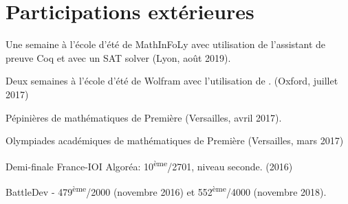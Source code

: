 \documentclass[11pt,a4paper,sans]{moderncv} %
\begin{document}
\section{Participations extérieures}
\begin{compactitem}
			
			\item Une semaine à l'école d'été de MathInFoLy avec utilisation de l'assistant de preuve Coq et  avec un SAT solver (Lyon, août 2019).
			
			\item Deux semaines à l'école d'été de Wolfram avec l'utilisation de . (Oxford, juillet 2017)
			
			\item Pépinières de mathématiques de Première (Versailles, avril 2017).
			
			\item Olympiades académiques de mathématiques de Première (Versailles, mars 2017)
			
			\item Demi-finale France-IOI Algoréa: 10\textsuperscript{ème}/2701, niveau seconde. (2016)
			
			\item BattleDev - 479\textsuperscript{ème}/2000 (novembre 2016) et 552\textsuperscript{ème}/4000 (novembre 2018).

		\end{compactitem}
\end{document}
